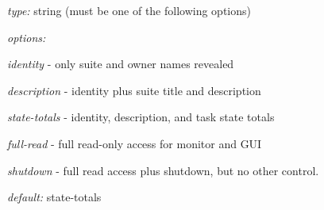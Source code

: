 \begin{myitemize}
\item {\em type:} string (must be one of the following options)
\item {\em options:}
    \begin{myitemize}
        \item {\em identity} - only suite and owner names revealed
        \item {\em description} - identity plus suite title and description
        \item {\em state-totals} - identity, description, and task state totals
        \item {\em full-read} - full read-only access for monitor and GUI
        \item {\em shutdown} - full read access plus shutdown, but no other
            control.
    \end{myitemize}
\item {\em default:} state-totals
\end{myitemize}
